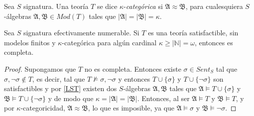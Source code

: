 \begin{definition}
Sea $S$ signatura. Una teoría $T$ se dice $\kappa$-\textit{categórica} si $\mathfrak{A} \approx \mathfrak{B}$,  para cualesquiera $S$-álgebras $\mathfrak{A}, \mathfrak{B} \in Mod(T)$ tales que $|\mathfrak{A}|= |\mathfrak{B}| = \kappa$.
\end{definition}

\begin{theorem}
Sea $S$ signatura efectivamente numerable. Si $T$ es una teoría satisfactible, sin modelos finitos y $\kappa$-categórica para algún cardinal $\kappa \geq|\mathbb{N}|=\omega$, entonces es completa.
\end{theorem}
\begin{proof}
Supongamos que $T$ no es completa. Entonces existe $\sigma \in Sent_S$ tal que $\sigma, \neg\sigma \notin T$, es decir, tal que $T \nvDash \sigma, \neg\sigma$ y entonces $T\cup\{\sigma\}$ y $T\cup\{\neg\sigma\}$ son satisfactibles y por \ref{LST} existen dos $S$-álgebras $\mathfrak{A}, \mathfrak{B}$ tales que $\mathfrak{A}\vDash T\cup \{\sigma\}$ y $\mathfrak{B}\vDash T\cup\{\neg\sigma\}$ y de modo que $\kappa = |\mathfrak{A}| = |\mathfrak{B}|$. Entonces, al ser $\mathfrak{A} \vDash T$ y $\mathfrak{B} \vDash T$, y por $\kappa$-categoricidad, $\mathfrak{A} \approx \mathfrak{B}$, lo que es imposible, ya que $\mathfrak{A}\vDash \sigma$ y $\mathfrak{B}\vDash \neg\sigma$.
\end{proof}

